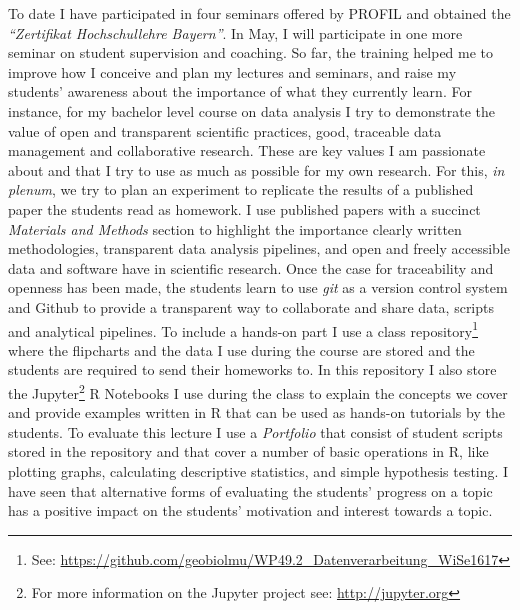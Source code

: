 \documentclass[a4paper,11pt]{article}
\begin{document}
To date I have participated in four seminars offered by PROFIL and obtained the \emph{``Zertifikat Hochschul\-lehre Bayern''}. In May, I will participate in one more seminar on student supervision and coaching. So far, the training helped me to improve how I conceive and plan my lectures and seminars, and raise my students' awareness about the importance of what they currently learn. For instance, for my bachelor level course on data analysis I try to demonstrate the value of open and transparent scientific practices, good, traceable data management and collaborative research. These are key values I am passionate about and that I try to use as much as possible for my own research. For this, \emph{in plenum}, we try to plan an experiment to replicate the results of a published paper the students read as homework. I use published papers with a succinct \emph{Materials and Methods} section to highlight the importance clearly written methodologies, transparent data analysis pipelines, and open and freely accessible data and software have in scientific research. Once the case for traceability and openness has been made, the students learn to use \emph{git} as a version control system and Github to provide a transparent way to collaborate and share data, scripts and analytical pipelines. To include a hands-on part I use a class repository\footnote{See: \href{https://github.com/geobiolmu/WP49.2_Datenverarbeitung_WiSe1617}{https://github.com/geobiolmu/WP49.2\_Datenverarbeitung\_WiSe1617}} where the flipcharts and the data I use during the course are stored and the students are required to send their homeworks to. In this repository I also store the Jupyter\footnote{For more information on the Jupyter project see: \href{http://jupyter.org}{http://jupyter.org}} R Notebooks I use during the class to explain the concepts we cover and provide examples written in R that can be used as hands-on tutorials by the students. To evaluate this lecture I use a \emph{Portfolio} that consist of student scripts stored in the repository and that cover a number of basic operations in R, like plotting graphs, calculating descriptive statistics, and simple hypothesis testing. I have seen that alternative forms of evaluating the students' progress on a topic has a positive impact on the students' motivation and interest towards a topic.\\
\end{document}
